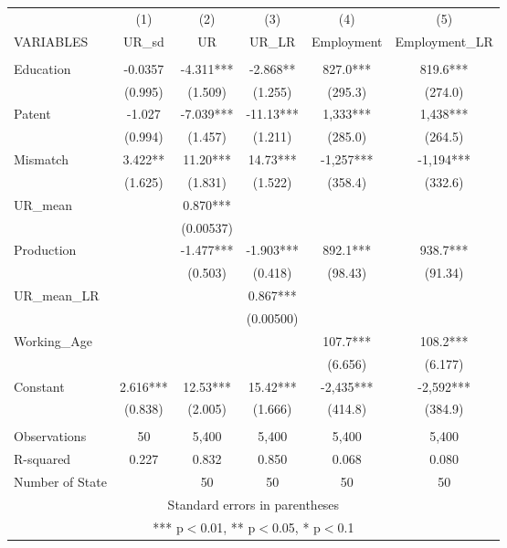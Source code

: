 \documentclass[]{article}
\begin{document}
\begin{tabular}{lccccc} \hline
 & (1) & (2) & (3) & (4) & (5) \\
VARIABLES & UR\_sd & UR & UR\_LR & Employment & Employment\_LR \\ \hline
 &  &  &  &  &  \\
Education & -0.0357 & -4.311*** & -2.868** & 827.0*** & 819.6*** \\
 & (0.995) & (1.509) & (1.255) & (295.3) & (274.0) \\
Patent & -1.027 & -7.039*** & -11.13*** & 1,333*** & 1,438*** \\
 & (0.994) & (1.457) & (1.211) & (285.0) & (264.5) \\
Mismatch & 3.422** & 11.20*** & 14.73*** & -1,257*** & -1,194*** \\
 & (1.625) & (1.831) & (1.522) & (358.4) & (332.6) \\
UR\_mean &  & 0.870*** &  &  &  \\
 &  & (0.00537) &  &  &  \\
Production &  & -1.477*** & -1.903*** & 892.1*** & 938.7*** \\
 &  & (0.503) & (0.418) & (98.43) & (91.34) \\
UR\_mean\_LR &  &  & 0.867*** &  &  \\
 &  &  & (0.00500) &  &  \\
Working\_Age &  &  &  & 107.7*** & 108.2*** \\
 &  &  &  & (6.656) & (6.177) \\
Constant & 2.616*** & 12.53*** & 15.42*** & -2,435*** & -2,592*** \\
 & (0.838) & (2.005) & (1.666) & (414.8) & (384.9) \\
 &  &  &  &  &  \\
Observations & 50 & 5,400 & 5,400 & 5,400 & 5,400 \\
R-squared & 0.227 & 0.832 & 0.850 & 0.068 & 0.080 \\
 Number of State &  & 50 & 50 & 50 & 50 \\ \hline
\multicolumn{6}{c}{ Standard errors in parentheses} \\
\multicolumn{6}{c}{ *** p$<$0.01, ** p$<$0.05, * p$<$0.1} \\
\end{tabular}
\end{document}
